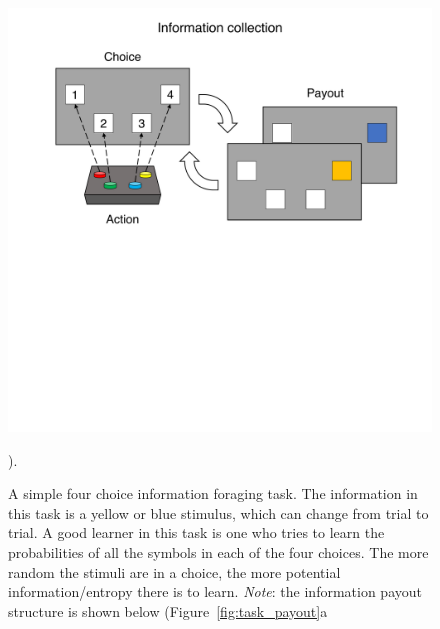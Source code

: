 \begin{figure}

	\includegraphics[width=0.7\linewidth]{img/task_outline1.pdf} 
	\caption{A simple four choice information foraging task. The information in this task is a yellow or blue stimulus, which can change from trial to trial. A good learner in this task is one who tries to learn the probabilities of all the symbols in each of the four choices. The more random the stimuli are in a choice, the more potential information/entropy there is to learn. \textit{Note}: the information payout structure is shown below (Figure~\ref{fig:task_payout}a}).
	\label{fig:task_outline1} 
\end{figure}

